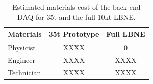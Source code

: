 \begin{table}[tbh]
\begin{center}
\begin{tabular}{|l|c|c|}   
\hline \hline 
Materials    & 35t  Prototype  &Full LBNE \\      
\hline
   Physicist           & XXXX&0 \\ 
   Engineer           & XXXX& XXXX\\ 
   Technician        & XXXX&XXXX \\ 
\hline \hline
\end{tabular}
\caption[]{Estimated materials cost of the back-end DAQ for 35t and the full 10kt LBNE.}
\label{tab:labor} 
\end{center}
\end{table}

